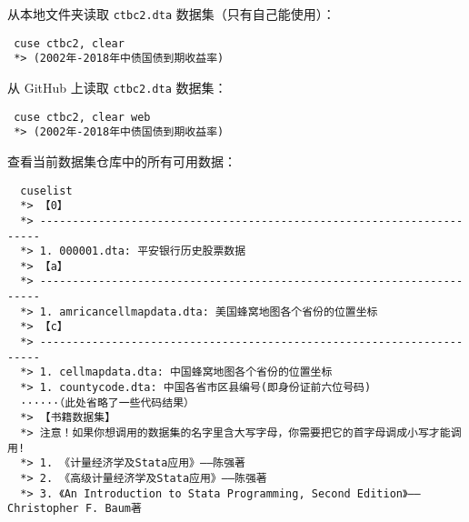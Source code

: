 \documentclass[lang=cn,11pt]{elegantpaper}
\begin{document}
从本地文件夹读取 \lstinline{ctbc2.dta} 数据集（只有自己能使用）：

\begin{lstlisting}
 cuse ctbc2, clear
 *> (2002年-2018年中债国债到期收益率)
\end{lstlisting}

从 GitHub 上读取 \lstinline{ctbc2.dta} 数据集：

\begin{lstlisting}
 cuse ctbc2, clear web
 *> (2002年-2018年中债国债到期收益率)
\end{lstlisting}

查看当前数据集仓库中的所有可用数据：

\begin{lstlisting}
  cuselist
  *> 【0】
  *> ----------------------------------------------------------------------
  *> 1. 000001.dta: 平安银行历史股票数据
  *> 【a】
  *> ----------------------------------------------------------------------
  *> 1. amricancellmapdata.dta: 美国蜂窝地图各个省份的位置坐标
  *> 【c】
  *> ----------------------------------------------------------------------
  *> 1. cellmapdata.dta: 中国蜂窝地图各个省份的位置坐标
  *> 1. countycode.dta: 中国各省市区县编号(即身份证前六位号码)
  ······（此处省略了一些代码结果）
  *> 【书籍数据集】
  *> 注意！如果你想调用的数据集的名字里含大写字母，你需要把它的首字母调成小写才能调用!
  *> 1. 《计量经济学及Stata应用》——陈强著
  *> 2. 《高级计量经济学及Stata应用》——陈强著
  *> 3. 《An Introduction to Stata Programming, Second Edition》——Christopher F. Baum著
\end{lstlisting}

\nocite{*}

\end{document}
